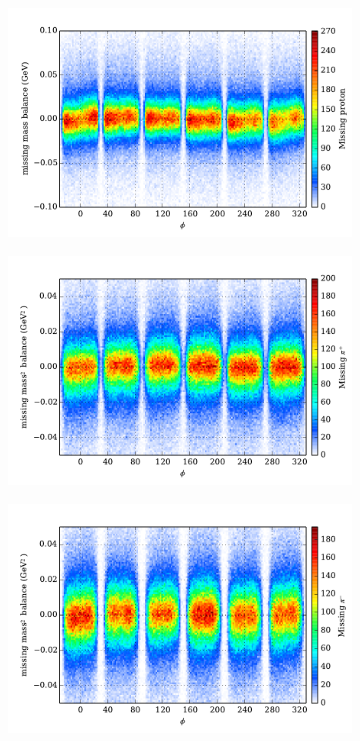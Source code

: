 \begin{figure}\begin{center}
\begin{subfigure}{0.4\columnwidth}
    \includegraphics[width=\columnwidth]{figures/pcor/pcor_mpbal.pdf}
\end{subfigure}
\begin{subfigure}{0.4\columnwidth}
    \includegraphics[width=\columnwidth]{figures/pcor/pcor_mpipbal.pdf}
\end{subfigure}
\begin{subfigure}{0.4\columnwidth}
    \includegraphics[width=\columnwidth]{figures/pcor/pcor_mpimbal.pdf}

\end{subfigure}
\end{center}
\end{figure}
